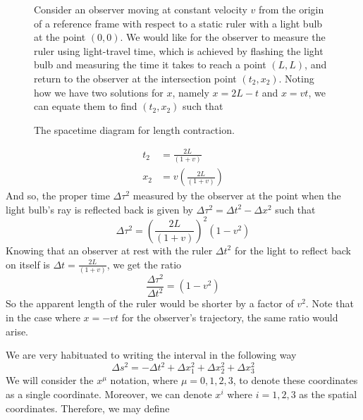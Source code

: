 \documentclass{article}
\begin{document}
\begin{exmp}
\begin{figure}[h]
\begin{minipage}{0.4\textwidth}
 					\caption{The spacetime diagram for length contraction. }
 				\end{minipage}
 				\hfill
 				\begin{minipage}{0.56\textwidth}
 					\begin{spacing}{1.5}
 						Consider an observer moving at constant velocity $v$ from the origin of a reference frame  with respect to a static ruler with a light bulb at the point $(0,0)$. We would like for the observer to measure the ruler using light-travel time, which is achieved by flashing the light bulb and measuring the time it takes to reach a point $(L,L)$, and return to the observer at the intersection point $(t_2, x_2)$. Noting how we have two solutions for $x$, namely $x = 2L-t$ and $x=vt$, we can equate them to find $(t_2, x_2)$ such that
 					\end{spacing}
 				\end{minipage}
 			\end{figure} 
 			\vspace{-1cm}
 			\begin{align*}
 				t_2 &= \frac{2L}{(1+v)}\\
 				x_2 &= v \left( \frac{2L}{(1+v)} \right)
 			\end{align*}
 			And so, the proper time $\Delta \tau^2$ measured by the observer at the point when the light bulb's ray is reflected back is given by $\Delta \tau^2 = \Delta t^2 - \Delta x^2$ such that
 			$$ \Delta \tau^2 = \left(\frac{2L}{(1+v)}\right)^2(1 - v^2)$$
 			Knowing that an observer at rest with the ruler $\Delta t^2$ for the light to reflect back on itself is $\Delta t = \frac{2L}{(1+v)}$, we get the ratio
 			$$ \frac{\Delta \tau^2}{\Delta t^2} = (1-v^2)$$
 			So the apparent length of the ruler would be shorter by a factor of $v^2$. Note that in the case where $x = -vt$ for the observer's trajectory, the same ratio would arise.
 		\end{exmp}
	 	We are very habituated to writing the interval in the following way
	 	$$ \Delta s^2 = - \Delta t^2 + \Delta x_1^2 + \Delta x_2^2 + \Delta x_3^2$$
	 	We will consider the $x^\mu$ notation, where $\mu=0,1,2,3$, to denote these coordinates as a single coordinate. Moreover, we can denote $x^i$ where $i=1,2,3$ as the spatial coordinates. Therefore, we may define
\end{document}
